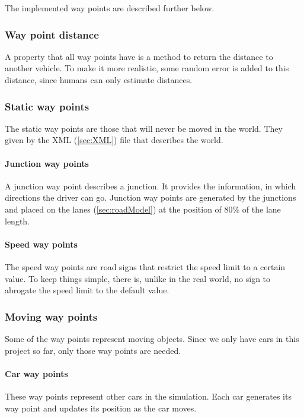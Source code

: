 \noindent The implemented way points are described further below. \\

\subsubsection{Way point distance}
\label{sec:movingWPDistance}
A property that all way points have is a method to 
return the distance to another vehicle. To make it more realistic, some random 
error is added to this distance, since humans can only estimate distances.

\subsubsection{Static way points}

The static way points are those that will never be moved in the world.
They given by the XML (\ref{sec:XML}) file that describes the world.

\paragraph{Junction way points}
A junction way point describes a junction. It provides the information, in
which directions the driver can go. Junction way points are generated by the
junctions and placed on the lanes (\ref{sec:roadModel}) at the position of
80\% of the lane length.

\paragraph{Speed way points}
The speed way points are road signs that restrict the speed limit to a certain
value. To keep things simple, there is, unlike in the real world, no sign to 
abrogate the speed limit to the default value. \\

\subsubsection{Moving way points}

Some of the way points represent moving objects. Since we only have cars in this
project so far, only those way points are needed. \\

\paragraph{Car way points}
These way points represent other cars in the simulation. Each car generates its
way point and updates its position as the car moves.

